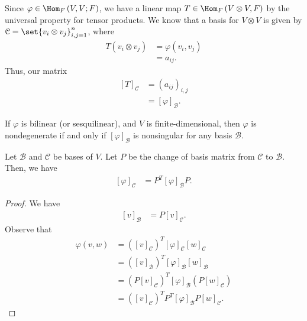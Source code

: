 \documentclass[10pt]{mypackage}
\begin{document}
  Since $\varphi\in \Hom_{F}\left(V,V;F\right)$, we have a linear map $T \in \Hom_{F}\left(V\otimes V,F\right)$ by the universal property for tensor products. We know that a basis for $V\otimes V$ is given by $\mathcal{C} = \set{v_i\otimes v_j}_{i,j=1}^{n}$, where
  \begin{align*}
    T\left(v_{i}\otimes v_j\right) &= \varphi\left(v_i,v_j\right)\\
                                   &= a_{ij}.
  \end{align*}
  Thus, our matrix
  \begin{align*}
    \left[T\right]_{\mathcal{C}} &= \left(a_{ij}\right)_{i,j}\\
                                 &= \left[\varphi\right]_{\mathcal{B}}.
  \end{align*}
  \begin{corollary}
    If $\varphi$ is bilinear (or sesquilinear), and $V$ is finite-dimensional, then $\varphi$ is nondegenerate if and only if $\left[\varphi\right]_{\mathcal{B}}$ is nonsingular for any basis $\mathcal{B}$.
  \end{corollary}
  \begin{theorem}
    Let $\mathcal{B}$ and $\mathcal{C}$ be bases of $V$. Let $P$ be the change of basis matrix from $\mathcal{C}$ to $\mathcal{B}$. Then, we have
    \begin{align*}
      \left[\varphi\right]_{\mathcal{C}} &= P^{T}\left[\varphi\right]_{\mathcal{B}}P.
    \end{align*}
  \end{theorem}
  \begin{proof}
    We have
    \begin{align*}
      \left[v\right]_{\mathcal{B}} &= P\left[v\right]_{\mathcal{C}}.
    \end{align*}
    Observe that
    \begin{align*}
      \varphi\left(v,w\right) &= \left(\left[v\right]_{\mathcal{C}}\right)^{T} \left[\varphi\right]_{\mathcal{C}}\left[w\right]_{\mathcal{C}}\\
                              &= \left(\left[v\right]_{\mathcal{B}}\right)^{T}\left[\varphi\right]_{\mathcal{B}}\left[w\right]_{\mathcal{B}}\\
                              &= \left(P\left[v\right]_{\mathcal{C}}\right)^{T}\left[\varphi\right]_{\mathcal{B}}\left(P\left[w\right]_{\mathcal{C}}\right)\\
                              &= \left(\left[v\right]_{\mathcal{C}}\right)^{T}P^{T}\left[\varphi\right]_{\mathcal{B}}P \left[w\right]_{\mathcal{C}}.
    \end{align*}
    
  \end{proof}
\end{document}
